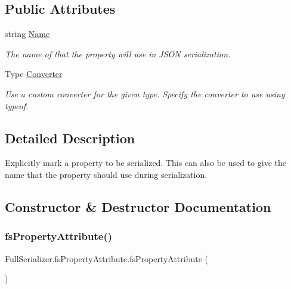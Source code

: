\subsection*{Public Attributes}
\begin{DoxyCompactItemize}
\item 
string \hyperlink{class_full_serializer_1_1fs_property_attribute_ab1b4b66609dc00829628f6d8f07be273}{Name}
\begin{DoxyCompactList}\small\item\em The name of that the property will use in J\+S\+ON serialization. \end{DoxyCompactList}\item 
Type \hyperlink{class_full_serializer_1_1fs_property_attribute_aaaf462a84a2ab5cdca315894a11033bc}{Converter}
\begin{DoxyCompactList}\small\item\em Use a custom converter for the given type. Specify the converter to use using typeof. \end{DoxyCompactList}\end{DoxyCompactItemize}


\subsection{Detailed Description}
Explicitly mark a property to be serialized. This can also be used to give the name that the property should use during serialization. 



\subsection{Constructor \& Destructor Documentation}
\mbox{\label{class_full_serializer_1_1fs_property_attribute_a29fe552a06d5ad3abab158abf96f9b89}} 
\subsubsection{\texorpdfstring{fs\+Property\+Attribute()}{fsPropertyAttribute()}\hspace{0.1cm}{\footnotesize\ttfamily [1/2]}}
{\footnotesize\ttfamily Full\+Serializer.\+fs\+Property\+Attribute.\+fs\+Property\+Attribute (\begin{DoxyParamCaption}{ }\end{DoxyParamCaption})\hspace{0.3cm}{\ttfamily [inline]}}



